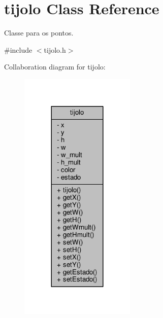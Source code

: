 \hypertarget{classtijolo}{}\section{tijolo Class Reference}
\label{classtijolo}


Classe para os pontos.  




{\ttfamily \#include $<$tijolo.\+h$>$}



Collaboration diagram for tijolo\+:
\nopagebreak
\begin{figure}[H]
\begin{center}
\leavevmode
\includegraphics[width=156pt]{classtijolo__coll__graph}
\end{center}
\end{figure}
